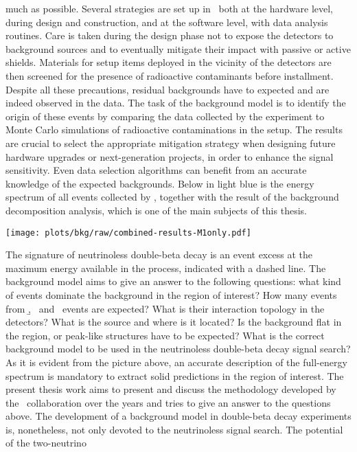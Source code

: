 much as possible. Several strategies are set up in \gerda\ both at the hardware level,
during design and construction, and at the software level, with data analysis routines.
Care is taken during the design phase not to expose the detectors to background sources
and to eventually mitigate their impact with passive or active shields. Materials for
setup items deployed in the vicinity of the detectors are then screened for the presence
of radioactive contaminants before installment. Despite all these precautions, residual
backgrounds have to expected and are indeed observed in the data. The task of the
background model is to identify the origin of these events by comparing the data collected
by the experiment to Monte Carlo simulations of radioactive contaminations in the setup.
The results are crucial to select the appropriate mitigation strategy when designing
future hardware upgrades or next-generation projects, in order to enhance the signal
sensitivity. Even data selection algorithms can benefit from an accurate knowledge of the
expected backgrounds.  Below in light blue is the energy spectrum of all events collected
by \gerda, together with the result of the background decomposition analysis, which is one
of the main subjects of this thesis.
\begin{center}
  \vspace{11pt}
  \texttt{[image: plots/bkg/raw/combined-results-M1only.pdf]}
\end{center}
The signature of neutrinoless double-beta decay is an event excess at the maximum energy
available in the process, indicated with a dashed line. The background model aims to give
an answer to the following questions: what kind of events dominate the background in the
region of interest? How many events from \b, \g\ and \a\ events are expected? What is
their interaction topology in the detectors? What is the source and where is it located?
Is the background flat in the region, or peak-like structures have to be expected?  What
is the correct background model to be used in the neutrinoless double-beta decay signal
search? As it is evident from the picture above, an accurate description of the
full-energy spectrum is mandatory to extract solid predictions in the region of interest.
The present thesis work aims to present and discuss the methodology developed by the
\gerda\ collaboration over the years and tries to give an answer to the questions above.
\newpar
The development of a background model in double-beta decay experiments is, nonetheless,
not only devoted to the neutrinoless signal search. The potential of the two-neutrino
